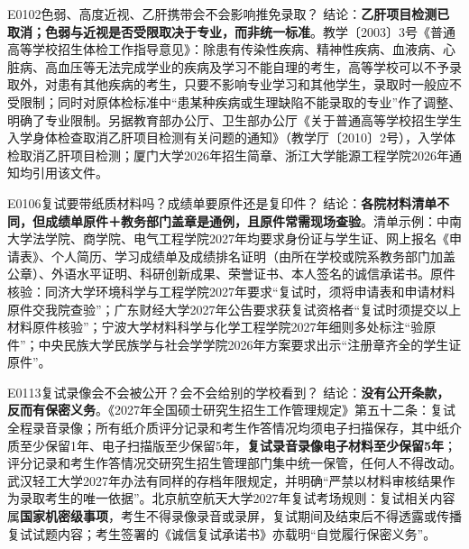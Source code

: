 \begin{qa}{E0102}{色弱、高度近视、乙肝携带会不会影响推免录取？}
结论：\textbf{乙肝项目检测已取消；色弱与近视是否受限取决于专业，而非统一标准}。教学〔2003〕3号《普通高等学校招生体检工作指导意见》：除患有传染性疾病、精神性疾病、血液病、心脏病、高血压等无法完成学业的疾病及学习不能自理的考生，高等学校可以不予录取外，对患有其他疾病的考生，只要不影响专业学习和其他学生，录取时一般应不受限制；同时对原体检标准中“患某种疾病或生理缺陷不能录取的专业”作了调整、明确了专业限制。另据教育部办公厅、卫生部办公厅《关于普通高等学校招生学生入学身体检查取消乙肝项目检测有关问题的通知》（教学厅〔2010〕2号），入学体检取消乙肝项目检测；厦门大学2026年招生简章、浙江大学能源工程学院2026年通知均引用该文件。
\end{qa}

\begin{qa}{E0106}{复试要带纸质材料吗？成绩单要原件还是复印件？}
结论：\textbf{各院材料清单不同，但成绩单原件＋教务部门盖章是通例，且原件常需现场查验}。清单示例：中南大学法学院、商学院、电气工程学院2027年均要求身份证与学生证、网上报名《申请表》、个人简历、学习成绩单及成绩排名证明（由所在学校或院系教务部门加盖公章）、外语水平证明、科研创新成果、荣誉证书、本人签名的诚信承诺书。原件核验：同济大学环境科学与工程学院2027年要求“复试时，须将申请表和申请材料原件交我院查验”；广东财经大学2027年公告要求获复试资格者“复试时须提交以上材料原件核验”；宁波大学材料科学与化学工程学院2027年细则多处标注“验原件”；中央民族大学民族学与社会学学院2026年方案要求出示“注册章齐全的学生证原件”。
\end{qa}

\begin{qa}{E0113}{复试录像会不会被公开？会不会给别的学校看到？}
结论：\textbf{没有公开条款，反而有保密义务}。《2027年全国硕士研究生招生工作管理规定》第五十二条：复试全程录音录像；所有纸介质评分记录和考生作答情况均须电子扫描保存，其中纸介质至少保留1年、电子扫描版至少保留5年，\textbf{复试录音录像电子材料至少保留5年}；评分记录和考生作答情况交研究生招生管理部门集中统一保管，任何人不得改动。武汉轻工大学2027年办法有同样的存档年限规定，并明确“严禁以材料审核结果作为录取考生的唯一依据”。北京航空航天大学2027年复试考场规则：复试相关内容属\textbf{国家机密级事项}，考生不得录像录音或录屏，复试期间及结束后不得透露或传播复试试题内容；考生签署的《诚信复试承诺书》亦载明“自觉履行保密义务”。
\end{qa}


